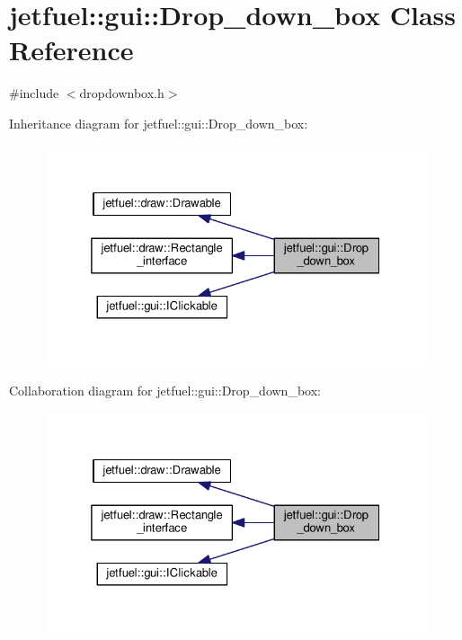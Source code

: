 \hypertarget{classjetfuel_1_1gui_1_1Drop__down__box}{}\section{jetfuel\+:\+:gui\+:\+:Drop\+\_\+down\+\_\+box Class Reference}
\label{classjetfuel_1_1gui_1_1Drop__down__box}


{\ttfamily \#include $<$dropdownbox.\+h$>$}



Inheritance diagram for jetfuel\+:\+:gui\+:\+:Drop\+\_\+down\+\_\+box\+:\nopagebreak
\begin{figure}[H]
\begin{center}
\leavevmode
\includegraphics[width=325pt]{classjetfuel_1_1gui_1_1Drop__down__box__inherit__graph}
\end{center}
\end{figure}


Collaboration diagram for jetfuel\+:\+:gui\+:\+:Drop\+\_\+down\+\_\+box\+:\nopagebreak
\begin{figure}[H]
\begin{center}
\leavevmode
\includegraphics[width=325pt]{classjetfuel_1_1gui_1_1Drop__down__box__coll__graph}
\end{center}
\end{figure}
